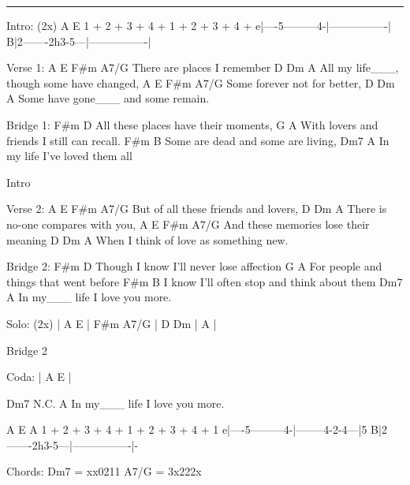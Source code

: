 \noindent\rule{\columnwidth}{1pt}

\begin{multicols}{2}
\begin{lsttab}
Intro: (2x)
  A                E 
  1 + 2 + 3 + 4 +  1 + 2 + 3 + 4 + 
e|----5---------4-|----------------| 
B|2-------2h3-5---|----------------|
\end{lsttab}

\begin{lstsong}
Verse 1:
          A      E   F#m   A7/G    
There are places I remember
       D   Dm           A
All my life___, though some have changed,
        A    E       F#m     A7/G 
Some forever not for better,
           D   Dm        A
Some have gone___ and some remain.

Bridge 1:
          F#m               D
All these places have their moments,
     G                    A
With lovers and friends I still can recall.
         F#m               B
Some are dead and some are living,
   Dm7           A
In my life I've loved them all

Intro

Verse 2:
       A         E           F#m   A7/G
But of all these friends and lovers,
         D  Dm      A
There is no-one compares with you,
           A        E          F#m   A7/G
And these memories lose their meaning
        D       Dm      A
When I think of love as something new.
\end{lstsong}
\columnbreak
\begin{lstsong}
Bridge 2:
         F#m                    D
Though I know I'll never lose affection
    G                      A
For people and things that went before
  F#m                            B
I know I'll often stop and think about them
   Dm7           A     
In my___ life I love you more.

Solo: (2x) 
| A E | F#m A7/G | D Dm | A | 

Bridge 2

Coda:
| A E |

   Dm7         N.C.      A 
In my___ life I love you more.
\end{lstsong}
\begin{lsttab}
  A                E                A
  1 + 2 + 3 + 4 +  1 + 2 + 3 + 4 +  1 
e|----5---------4-|--------4-2-4---|5  
B|2-------2h3-5---|----------------|-
\end{lsttab}

\begin{lstsong}


Chords:
Dm7   = xx0211
A7/G  = 3x222x
\end{lstsong}
\end{multicols}
\newpage

